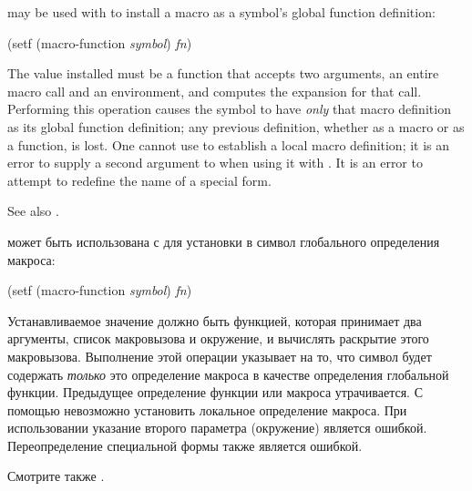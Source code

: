 \begin{newer}
\begin{defun}[Function]
 may be used with  to install
a macro as a symbol's global function definition:
\begin{lisp}
(setf (macro-function \emph{symbol}) \emph{fn})
\end{lisp}
The value installed must be a function that accepts two arguments,
an entire macro call and an environment, and computes the expansion for that call.
Performing this operation causes the symbol to have \emph{only} that
macro definition as its global function definition; any previous
definition, whether as a macro or as a function, is lost.
One cannot use  to establish a local macro definition;
it is an error to supply a second argument to 
when using it with .
It is an error to attempt to redefine the name of a special form.

See also .

 может быть использована с  для установки в символ
глобального определения макроса:
\begin{lisp}
(setf (macro-function \emph{symbol}) \emph{fn})
\end{lisp}
Устанавливаемое значение должно быть функцией, которая принимает два аргументы,
список макровызова и окружение, и вычислять раскрытие этого макровызова. 
Выполнение этой операции указывает на то, что символ будет содержать \emph{только} это
определение макроса в качестве определения глобальной функции. Предыдущее
определение функции или макроса утрачивается. С помощью  невозможно
установить локальное определение макроса. При использовании  указание
второго параметра (окружение) является ошибкой.
Переопределение специальной формы также является ошибкой.

Смотрите также .
\end{defun}
\end{newer}

